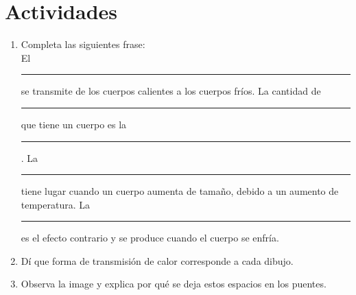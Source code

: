 \section*{Actividades}

\begin{enumerate}
\item{Completa las siguientes frase:
\\
El \rule{4cm}{0.2mm} se transmite de los cuerpos calientes a los cuerpos fríos. 
La cantidad de \rule{4cm}{0.2mm} que tiene un cuerpo es la \rule{4cm}{0.2mm}.
La \rule{4cm}{0.2mm} tiene lugar cuando un cuerpo aumenta de tamaño, debido a un aumento de temperatura.
La \rule{4cm}{0.2mm} es el efecto contrario y se produce cuando el cuerpo se enfría.
}

\item{Dí que forma de transmisión de calor corresponde a cada dibujo.}


\item{Observa la image y explica por qué se deja estos espacios en los puentes.}




\end{enumerate}